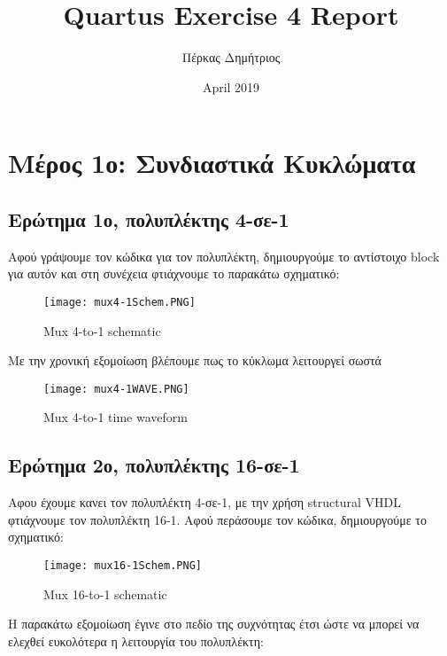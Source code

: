 \documentclass{article}
\title{\foreignlanguage{english}{Quartus Exercise 4 Report}}
\author{Πέρκας Δημήτριος}
\date{\foreignlanguage{english}{April 2019}}
\begin{document}
\maketitle
\thispagestyle{empty}

\clearpage
\thispagestyle{empty}
\tableofcontents
\listoffigures
\clearpage
{}

\section{Μέρος 1ο: Συνδιαστικά Κυκλώματα}

\subsection{Ερώτημα 1ο, πολυπλέκτης 4-σε-1}

Αφού γράψουμε τον κώδικα για τον πολυπλέκτη, δημιουργούμε το αντίστοιχο \foreignlanguage{english}{block} για αυτόν και στη συνέχεια φτιάχνουμε το παρακάτω σχηματικό:

\begin{figure}[h!]
  \caption{\foreignlanguage{english}{Mux 4-to-1 schematic}}
\texttt{[image: mux4-1Schem.PNG]} 
\end{figure}

Με την χρονική εξομοίωση βλέπουμε πως το κύκλωμα λειτουργεί σωστά
\begin{figure}[h!]
  \caption{\foreignlanguage{english}{Mux 4-to-1 time waveform}}
\texttt{[image: mux4-1WAVE.PNG]}
\end{figure}

\subsection{Ερώτημα 2ο, πολυπλέκτης 16-σε-1}

Αφου έχουμε κανει τον πολυπλέκτη 4-σε-1, με την χρήση \foreignlanguage{english}{structural VHDL} φτιάχνουμε τον πολυπλέκτη 16-1. Αφού περάσουμε τον κώδικα, δημιουργούμε το σχηματικό:

\begin{figure}[h!]
  \caption{\foreignlanguage{english}{Mux 16-to-1 schematic}}
\texttt{[image: mux16-1Schem.PNG]} 
\end{figure}

Η παρακάτω εξομοίωση έγινε στο πεδίο της συχνότητας έτσι ώστε να μπορεί να ελεχθεί ευκολότερα η λειτουργία του πολυπλέκτη:
\end{document}
